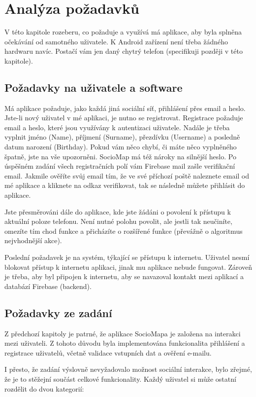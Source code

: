 \chapter{Analýza požadavků}
V této kapitole rozeberu, co požaduje a využívá má aplikace, aby byla splněna očekávání od samotného uživatele. K Android zařízení není třeba žádného hardwaru navíc. Postačí vám jen daný chytrý telefon (specifikuji později v této kapitole).

\section{Požadavky na uživatele a software}
Má aplikace požaduje, jako každá jiná sociální síť, přihlášení přes email a heslo. Jste-li nový uživatel v mé aplikaci, je nutno se registrovat. Registrace požaduje email a heslo, které jsou využívány k autentizaci uživatele. Nadále je třeba vyplnit jméno (Name), příjmení (Surname), přezdívku (Username) a posledně datum narození (Birthday). Pokud vám něco chybí, či máte něco vyplněného špatně, jste na vše upozorněni. SocioMap má též nároky na silnější heslo. Po úspěšném zadání všech registračních polí vám Firebase mail zašle verifikační email. Jakmile ověříte svůj email tím, že ve své příchozí poště naleznete email od mé aplikace a kliknete na odkaz verifikovat, tak se následně můžete přihlásit do aplikace. 

Jste přesměrováni dále do aplikace, kde jste žádáni o povolení k přístupu k aktuální poloze telefonu. Není nutné polohu povolit, ale jestli tak neučiníte, omezíte tím chod funkce a přicházíte o rozšířené funkce (převážně o algoritmus nejvhodnější akce). 

Poslední požadavek je na systém, týkající se přístupu k internetu. Uživatel nesmí blokovat přístup k internetu aplikaci, jinak mu aplikace nebude fungovat. Zároveň je třeba, aby byl připojen k internetu, aby se navazoval kontakt mezi aplikací a databází Firebase (backend). 

\section{Požadavky ze zadání}

Z předchozí kapitoly je patrné, že aplikace SocioMapa je založena na interakci mezi uživateli. Z tohoto důvodu byla implementována funkcionalita přihlášení a registrace uživatelů, včetně validace vstupních dat a ověření e-mailu.

I přesto, že zadání výslovně nevyžadovalo možnost sociální interakce, bylo zřejmé, že je to stěžejní součást celkové funkcionality. Každý uživatel si může ostatní rozdělit do dvou kategorií:

